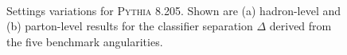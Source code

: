 \documentclass[11pt]{cernrep}
\begin{document}
\begin{figure}
\centering
{}
$\qquad$
\caption{Settings variations for \textsc{Pythia 8.205}.  Shown are (a) hadron-level and (b) parton-level results for the classifier separation $\Delta$ derived from the five benchmark angularities.}
\label{quarkgluon_fig:settings_variation_pythia}
\end{figure}
\end{document}
